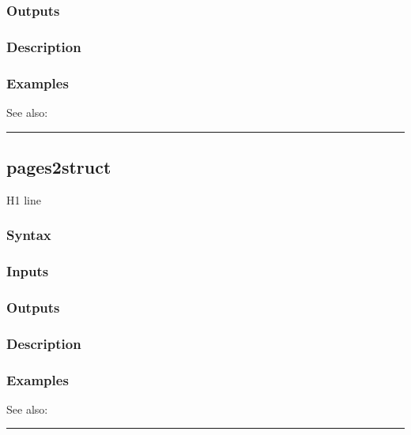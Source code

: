 \documentclass[letterpaper,10pt,english]{sphinxmanual}
\begin{document}
\subsubsection{Outputs}
\label{classes/time_series/@ts/ts:id413}

\subsubsection{Description}
\label{classes/time_series/@ts/ts:id414}

\subsubsection{Examples}
\label{classes/time_series/@ts/ts:id415}
See also:


\bigskip\hrule{}\bigskip



\subsection{pages2struct}
\label{classes/time_series/@ts/ts:pages2struct}\label{classes/time_series/@ts/ts:id416}
H1 line


\subsubsection{Syntax}
\label{classes/time_series/@ts/ts:id417}

\subsubsection{Inputs}
\label{classes/time_series/@ts/ts:id418}

\subsubsection{Outputs}
\label{classes/time_series/@ts/ts:id419}

\subsubsection{Description}
\label{classes/time_series/@ts/ts:id420}

\subsubsection{Examples}
\label{classes/time_series/@ts/ts:id421}
See also:


\bigskip\hrule{}\bigskip
\end{document}

